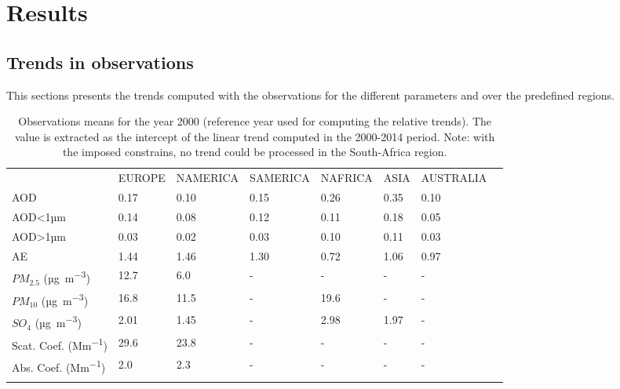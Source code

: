 \documentclass[journal abbreviation, manuscript]{copernicus}
\begin{document}
\section{Results}

\subsection{Trends in observations}
This sections presents the trends computed with the observations for the different parameters and over the predefined regions. 

\begin{table}
 \begin{tabular}{llllllll}
  \tophline
                                & EUROPE & NAMERICA & SAMERICA  & NAFRICA & ASIA & AUSTRALIA \\
  \middlehline
  AOD                           & 0.17   & 0.10     & 0.15     & 0.26          & 0.35 & 0.10      \\
  AOD<1µm                       & 0.14   & 0.08     & 0.12     & 0.11          & 0.18 & 0.05      \\
  AOD>1µm                       & 0.03   & 0.02     & 0.03     & 0.10          & 0.11 & 0.03      \\
  AE                            & 1.44   & 1.46     & 1.30     & 0.72         & 1.06 & 0.97      \\
  $PM_{2.5}$ (\unit{µg.m^{-3}}) & 12.7   & 6.0      & -        & -             & -    & -         \\
  $PM_{10}$ (\unit{µg.m^{-3}})  & 16.8   & 11.5     & -        & 19.6          & -    & -         \\
  $SO_{4}$ (\unit{µg.m^{-3}})   & 2.01   & 1.45     & -        & 2.98         & 1.97 & -         \\
  Scat. Coef. (\unit{Mm^{-1}})  & 29.6   & 23.8     & -        & -           & -    & -         \\
  Abs. Coef. (\unit{Mm^{-1}})   & 2.0    & 2.3      & -        & -           & -    & -         \\
  \bottomhline
 \end{tabular}

 \caption{Observations means for the year 2000 (reference year used for computing the relative trends). The value is extracted as the intercept of the linear trend computed in the 2000-2014 period. Note: with the imposed constrains, no trend could be processed in the South-Africa region.}
 \label{table:obs_2000mean}
\end{table}
\end{document}
